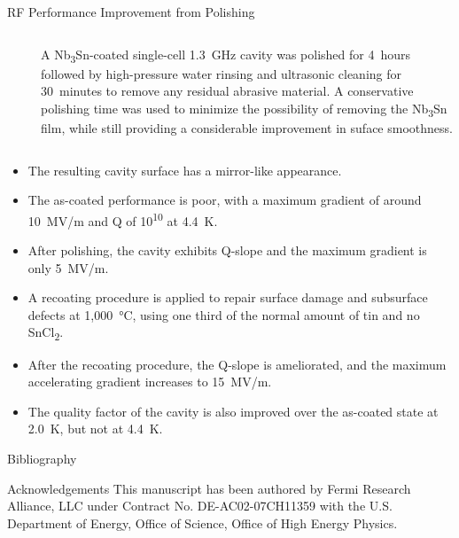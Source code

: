 \documentclass{beamer}
\begin{document}
\begin{frame}{}
\begin{columns}[t]
\begin{column}{0.32\textwidth}
\begin{block}{\label{sec:cavitycbp}RF Performance Improvement from Polishing}
\begin{columns}
\begin{column}{0.55\columnwidth}
\begin{figure}[t]
                            \end{figure}
                        \end{column}
                        \begin{column}{0.4\columnwidth}
                            A Nb\textsubscript{3}Sn-coated single-cell 1.3~GHz cavity was polished for 4~hours followed by high-pressure water rinsing and ultrasonic cleaning for 30~minutes to remove any residual abrasive material. A conservative polishing time was used to minimize the possibility of removing the Nb\textsubscript{3}Sn film, while still providing a considerable improvement in suface smoothness.
                        \end{column}
                    \end{columns}   
                    \begin{itemize}
                        \item The resulting cavity surface has a mirror-like appearance.
                        \item The as-coated performance is poor, with a maximum gradient of around 10~MV/m and Q of 10\textsuperscript{10} at 4.4~K.
                        \item After polishing, the cavity exhibits Q-slope and the maximum gradient is only 5~MV/m.
                        \item A recoating procedure is applied to repair surface damage and subsurface defects at 1,000~°C, using one third of the normal amount of tin and no SnCl\textsubscript{2}.
                        \item After the recoating procedure, the Q-slope is ameliorated, and the maximum accelerating gradient increases to 15~MV/m.
                        \item The quality factor of the cavity is also improved over the as-coated state at 2.0~K, but not at 4.4~K.
                    \end{itemize} 
                \end{block}
                \begin{block}{\label{sec:bibliography}Bibliography}
                    \small
                    
                    
                \end{block}
                \begin{block}{\label{sec:acknowledgements}Acknowledgements}
                    This manuscript has been authored by Fermi Research Alliance, LLC under Contract No. DE-AC02-07CH11359 with the U.S. Department of Energy, Office of Science, Office of High Energy Physics.
                \end{block}
            \end{column}
        \end{columns}
    \end{frame}
\end{document}
